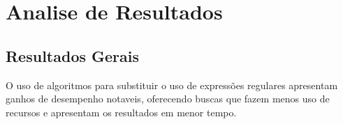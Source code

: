 
\chapter{Analise de Resultados} %
\label{cha:analise_de_resultados}




\section{Resultados Gerais} %
\label{sec:resultados_gerais}

O uso de algoritmos para substituir o uso de expressões regulares apresentam ganhos de desempenho notaveis, oferecendo buscas que fazem menos uso de recursos e apresentam os resultados em menor tempo.


